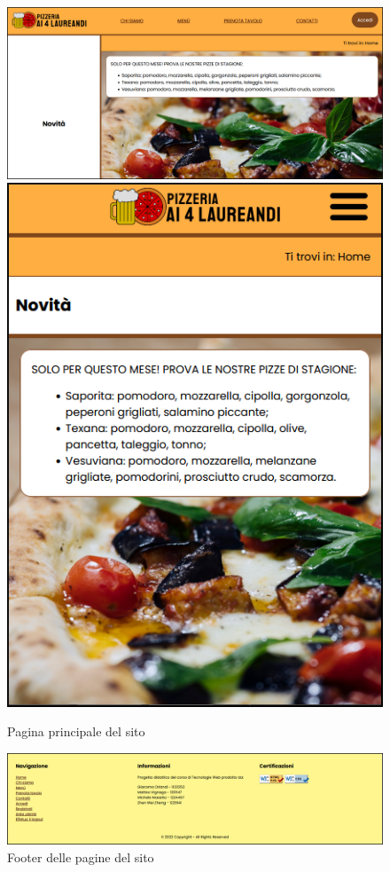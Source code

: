 \begin{figure}[H]
	\centering
	\includegraphics[scale=0.25]{resources/screenshot_index.png}
	\hspace{1cm}
	\includegraphics[scale=0.5]{resources/screenshot_index_mobile.png}
	\caption{Pagina principale del sito}
\end{figure}
\begin{figure}[H]
	\centering
	\includegraphics[scale=0.5]{resources/footer.png}
	\caption{Footer delle pagine del sito}
\end{figure}

